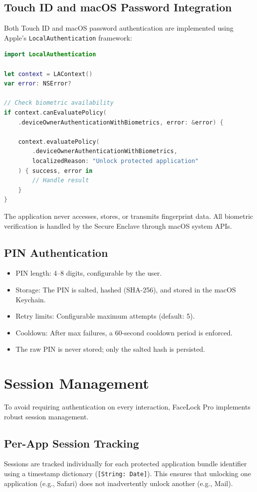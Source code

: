 \documentclass[12pt,a4paper]{report}
\begin{document}
\subsection{Touch ID and macOS Password Integration}
Both Touch ID and macOS password authentication are implemented using Apple's \texttt{LocalAuthentication} framework:

\begin{lstlisting}[language=Swift, caption={Touch ID / macOS Password via LAContext}]
import LocalAuthentication

let context = LAContext()
var error: NSError?

// Check biometric availability
if context.canEvaluatePolicy(
    .deviceOwnerAuthenticationWithBiometrics, error: &error) {
    
    context.evaluatePolicy(
        .deviceOwnerAuthenticationWithBiometrics,
        localizedReason: "Unlock protected application"
    ) { success, error in
        // Handle result
    }
}
\end{lstlisting}

The application never accesses, stores, or transmits fingerprint data. All biometric verification is handled by the Secure Enclave through macOS system APIs.

\subsection{PIN Authentication}
\begin{itemize}[noitemsep]
    \item PIN length: 4--8 digits, configurable by the user.
    \item Storage: The PIN is salted, hashed (SHA-256), and stored in the macOS Keychain.
    \item Retry limits: Configurable maximum attempts (default: 5).
    \item Cooldown: After max failures, a 60-second cooldown period is enforced.
    \item The raw PIN is never stored; only the salted hash is persisted.
\end{itemize}

\section{Session Management}
To avoid requiring authentication on every interaction, FaceLock Pro implements robust session management.

\subsection{Per-App Session Tracking}
Sessions are tracked individually for each protected application bundle identifier using a timestamp dictionary (\texttt{[String: Date]}). This ensures that unlocking one application (e.g., Safari) does not inadvertently unlock another (e.g., Mail). 
\end{document}

